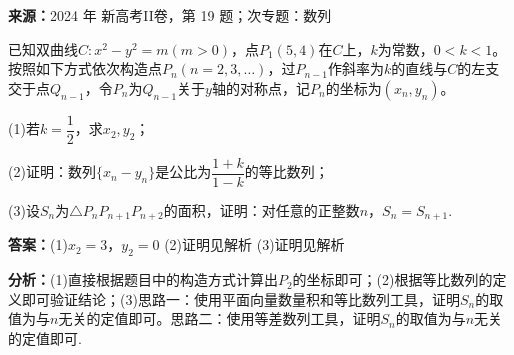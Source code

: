 \begin{question}[points=17]
\textbf{来源：}2024 年 新高考II卷，第 19 题；次专题：数列\par
已知双曲线$C:x^2-y^2=m(m>0)$，点$P_1(5,4)$在$C$上，$k$为常数，$0<k<1$。按照如下方式依次构造点$P_n(n=2,3,\ldots)$，过$P_{n-1}$作斜率为$k$的直线与$C$的左支交于点$Q_{n-1}$，令$P_n$为$Q_{n-1}$关于$y$轴的对称点，记$P_n$的坐标为$(x_n,y_n)$。

(1)若$k=\dfrac{1}{2}$，求$x_2,y_2$；

(2)证明：数列$\{x_n-y_n\}$是公比为$\dfrac{1+k}{1-k}$的等比数列；

(3)设$S_n$为$\triangle P_nP_{n+1}P_{n+2}$的面积，证明：对任意的正整数$n$，$S_n=S_{n+1}$.
\begin{solution}
\textbf{答案：}(1)$x_2=3$，$y_2=0$
(2)证明见解析
(3)证明见解析

\textbf{分析：}(1)直接根据题目中的构造方式计算出$P_2$的坐标即可；(2)根据等比数列的定义即可验证结论；(3)思路一：使用平面向量数量积和等比数列工具，证明$S_n$的取值为与$n$无关的定值即可。思路二：使用等差数列工具，证明$S_n$的取值为与$n$无关的定值即可.


\end{solution}
\end{question}
